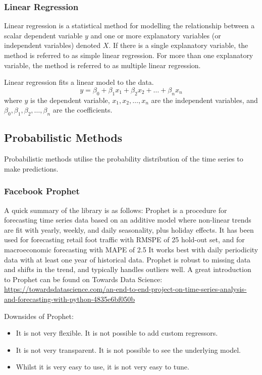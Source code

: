 \documentclass[manuscript,screen,nonacm,11pt]{acmart}                                                          %
\numberwithin{equation}{section}
\begin{document}
\subsubsection{Linear Regression}
Linear regression is a statistical method for modelling the relationship between a scalar dependent variable $y$ and one or more explanatory variables (or independent variables) denoted $X$.
If there is a single explanatory variable, the method is referred to as simple linear regression. For more than one explanatory variable, the method is referred to as multiple linear regression.

Linear regression fits a linear model to the data.
\begin{equation}
\label{eq:linear_regression}
y = \beta_0 + \beta_1 x_1 + \beta_2 x_2 + \dots + \beta_n x_n
\end{equation}
where $y$ is the dependent variable, $x_1, x_2, \dots, x_n$ are the independent variables, and $\beta_0, \beta_1, \beta_2, \dots, \beta_n$ are the coefficients.


\subsection{Probabilistic Methods}
Probabilistic methods utilise the probability distribution of the time series to make predictions.

\subsubsection{Facebook Prophet}
A quick summary of the library is as follows: 
    Prophet is a procedure for forecasting time series data based on an additive model 
    where non-linear trends are fit with yearly, weekly, and daily seasonality, plus 
    holiday effects.
    It has been used for forecasting retail foot traffic with RMSPE of 25%
    hold-out set, and for macroeconomic forecasting with MAPE of 2.5%
    It works best with daily periodicity data with at least one year of historical data.
    Prophet is robust to missing data and shifts in the trend, and typically handles outliers
    well.
    A great introduction to Prophet can be found on Towards Data Science:
    \url{https://towardsdatascience.com/an-end-to-end-project-on-time-series-analysis-and-forecasting-with-python-4835e6bf050b}


Downsides of Prophet:
\begin{itemize}
	\item It is not very flexible. It is not possible to add custom regressors.
	\item It is not very transparent. It is not possible to see the underlying model.
	\item Whilst it is very easy to use, it is not very easy to tune.
\end{itemize}
\end{document}
